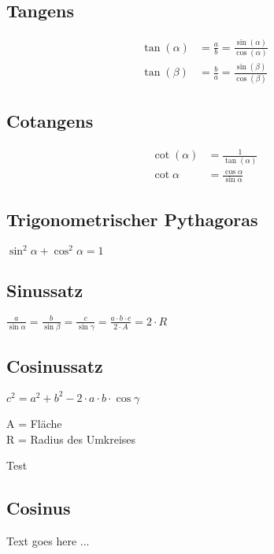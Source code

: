 \begin{sectionbox}
	\subsection{Tangens}
		\begin{emphbox}
			\begin{align*}
			\tan(\alpha) &= \frac{a}{b} = \frac{\sin(\alpha)}{\cos(\alpha)} \\
			\tan(\beta) &= \frac{b}{a} = \frac{\sin(\beta)}{\cos(\beta)}
			\end{align*}
		\end{emphbox}
		
	\subsection{Cotangens}
		\begin{emphbox}
			\begin{align*}
			\cot(\alpha) &= \frac{1}{\tan(\alpha)} \\
			\cot \alpha &= \frac{\cos \alpha}{\sin \alpha} 		
			\end{align*}
		\end{emphbox}

	\subsection{Trigonometrischer Pythagoras}
		\begin{emphbox}
			$ \sin ^2 \alpha + \cos ^2 \alpha = 1 $
		\end{emphbox}
		
	\subsection{Sinussatz}
		\begin{emphbox}
			$ \frac{a}{\sin \alpha} = \frac{b}{\sin \beta} = \frac{c}{\sin \gamma} = \frac{a \cdot b \cdot c}{2 \cdot A} = 2 \cdot R$
		\end{emphbox}

	\subsection{Cosinussatz}
		\begin{emphbox}
			$ c^2 = a^2 + b^2 - 2 \cdot a \cdot b \cdot \cos \gamma $
		\end{emphbox}

\begin{symbolbox}
	A = Fläche\\
	R = Radius des Umkreises
\end{symbolbox}

\begin{bluebox}
	Test
\end{bluebox}


\end{sectionbox}


\begin{sectionbox}
	\subsection{Cosinus}

	Text goes here ...


\end{sectionbox}


